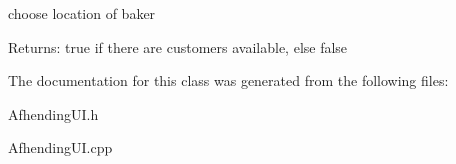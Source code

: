 choose location of baker 

\begin{Desc}
\item[Returns:]true if there are customers available, else false \end{Desc}


The documentation for this class was generated from the following files:\begin{CompactItemize}
\item 
Afhending\-UI.h\item 
Afhending\-UI.cpp\end{CompactItemize}
